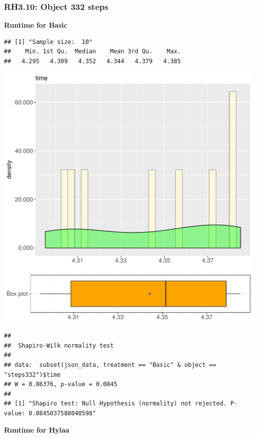 \documentclass{article}\usepackage[]{graphicx}\usepackage[]{color}
\makeatletter
\def\maxwidth{ %
  \ifdim\Gin@nat@width>\linewidth
    \linewidth
  \else
    \Gin@nat@width
  \fi
}
\newenvironment{kframe}{%
 \def\at@end@of@kframe{}%
 \ifinner\ifhmode%
  \def\at@end@of@kframe{\end{minipage}}%
  \begin{minipage}{\columnwidth}%
 \fi\fi%
 \def\FrameCommand##1{\hskip\@totalleftmargin \hskip-\fboxsep
 \colorbox{shadecolor}{##1}\hskip-\fboxsep
     \hskip-\linewidth \hskip-\@totalleftmargin \hskip\columnwidth}%
 \MakeFramed {\advance\hsize-\width
   \@totalleftmargin\z@ \linewidth\hsize
   \@setminipage}}%
 {\par\unskip\endMakeFramed%
 \at@end@of@kframe}
\newenvironment{knitrout}{}{} %
\makeatother
\begin{document}
\subsubsection{RH3.10: Object 332 steps}

 \textbf{Runtime for Basic}
\begin{knitrout}
\color{fgcolor}\begin{kframe}
\begin{verbatim}
## [1] "Sample size:  10"
##    Min. 1st Qu.  Median    Mean 3rd Qu.    Max. 
##   4.295   4.309   4.352   4.344   4.379   4.385
\end{verbatim}
\end{kframe}
\includegraphics[width=\maxwidth]{figure/RH3_Basic_steps332-1} 
\begin{kframe}\begin{verbatim}
## 
## 	Shapiro-Wilk normality test
## 
## data:  subset(json_data, treatment == "Basic" & object == "steps332")$time
## W = 0.86376, p-value = 0.0845
## 
## [1] "Shapiro test: Null Hypothesis (normality) not rejected. P-value: 0.0845037588040598"
\end{verbatim}
\end{kframe}
\end{knitrout}
 \textbf{Runtime for Hylaa}
\end{document}
